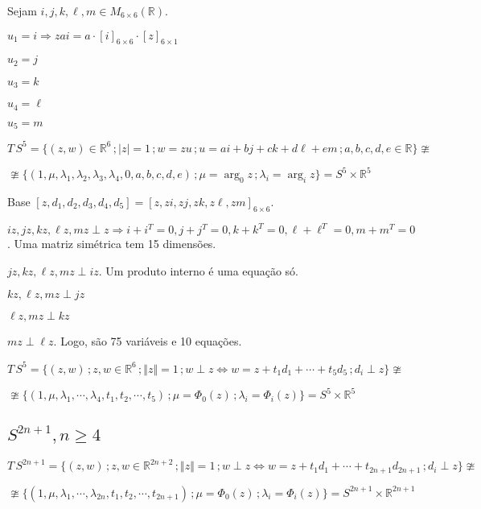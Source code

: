 \documentclass[10pt,a4paper]{article}
\begin{document}
		Sejam $i,j,k,\ell,m \in M_{6 \times 6}(\mathbb{R})$.

		$u_1 = i \Rightarrow zai = a \cdot [i]_{6 \times 6} \cdot [z]_{6 \times 1}$

		$u_2 = j$

		$u_3 = k$

		$u_4 = \ell$

		$u_5 = m$

		$T\,S^5 = \{ (z, w) \in \mathbb{R}^6 \,; |z| = 1\,; w = zu \,; u = ai + bj + ck + d\ell + em \,; a,b,c,d,e \in \mathbb{R}  \} \ncong $

		$ \ncong \{ (1, \mu, \lambda_1, \lambda_2, \lambda_3, \lambda_4, 0, a, b, c, d, e) \,; \mu = \arg_0 z \,; \lambda_i = \arg_i z  \} = S^5 \times \mathbb{R}^5$

		Base $[z, d_1, d_2, d_3, d_4, d_5] = [z, zi, zj, zk, z\ell, zm]_{6 \times 6}$.

		$iz, jz, kz, \ell z, mz \perp z \Rightarrow i + i^T = 0, j + j^T = 0, k + k^T = 0, \ell + \ell^T = 0, m + m^T = 0$. Uma matriz sim\'etrica tem 15 dimens\~oes.

		$jz, kz, \ell z, mz \perp iz$. Um produto interno \'e uma equa\c{c}\~ao s\'o.

		$kz, \ell z, mz \perp jz$

		$\ell z, mz \perp kz$

		$mz \perp \ell z$. Logo, s\~ao 75 vari\'aveis e 10 equa\c{c}\~oes.

		\vspace{3mm}

		$T\,S^5 = \{ (z, w) \,; z, w \in \mathbb{R}^6 \,; \Vert z \Vert = 1\,; w \perp z \Leftrightarrow w = z + t_1 d_1 + \cdots + t_5 d_5 \,; d_i \perp z \} \ncong$

		$\ncong \{ (1, \mu, \lambda_1, \cdots, \lambda_4, t_1, t_2, \cdots, t_5) \,; \mu = \Phi_0(z) \,; \lambda_i = \Phi_i(z) \} = S^5 \times \mathbb{R}^5$

		\subsection{$S^{2n+1}, n \ge 4$}
		\begin{flushright}
		\end{flushright}

		$T\,S^{2n + 1} = \{ (z, w) \,; z, w \in \mathbb{R}^{2n + 2} \,; \Vert z \Vert = 1\,; w \perp z \Leftrightarrow w = z + t_1 d_1 + \cdots + t_{2n + 1} d_{2n + 1} \,; d_i \perp z \} \ncong$

		$\ncong \{ (1, \mu, \lambda_1, \cdots, \lambda_{2n}, t_1, t_2, \cdots, t_{2n + 1}) \,; \mu = \Phi_0(z) \,; \lambda_i = \Phi_i(z) \} = S^{2n + 1} \times \mathbb{R}^{2n + 1}$
\end{document}
